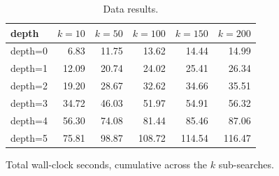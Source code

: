 \begin{table}[H]
\centering
\caption{Data results.}
\small
\setlength{\tabcolsep}{6pt}
\begin{tabular}{lrrrrr}
\toprule
\textbf{depth} & \textbf{$k{=}10$} & \textbf{$k{=}50$} & \textbf{$k{=}100$} & \textbf{$k{=}150$} & \textbf{$k{=}200$} \\
\midrule
  depth=0 & \cellcolor[HTML]{63BE7B}6.83 & \cellcolor[HTML]{63BE7B}11.75 & \cellcolor[HTML]{63BE7B}13.62 & \cellcolor[HTML]{63BE7B}14.44 & \cellcolor[HTML]{63BE7B}14.99 \\
  depth=1 & \cellcolor[HTML]{7BC57C}12.09 & \cellcolor[HTML]{83C77D}20.74 & \cellcolor[HTML]{85C87D}24.02 & \cellcolor[HTML]{85C87D}25.41 & \cellcolor[HTML]{86C87D}26.34 \\
  depth=2 & \cellcolor[HTML]{9BCE7E}19.20 & \cellcolor[HTML]{A0CF7E}28.67 & \cellcolor[HTML]{A1D07F}32.62 & \cellcolor[HTML]{A2D07F}34.66 & \cellcolor[HTML]{A2D07F}35.51 \\
  depth=3 & \cellcolor[HTML]{E1E282}34.72 & \cellcolor[HTML]{DEE182}46.03 & \cellcolor[HTML]{E1E282}51.97 & \cellcolor[HTML]{E1E282}54.91 & \cellcolor[HTML]{E2E382}56.32 \\
  depth=4 & \cellcolor[HTML]{FCB379}56.30 & \cellcolor[HTML]{FCB379}74.08 & \cellcolor[HTML]{FCB479}81.44 & \cellcolor[HTML]{FCB57A}85.46 & \cellcolor[HTML]{FCB479}87.06 \\
  depth=5 & \cellcolor[HTML]{F8696B}75.81 & \cellcolor[HTML]{F8696B}98.87 & \cellcolor[HTML]{F8696B}108.72 & \cellcolor[HTML]{F8696B}114.54 & \cellcolor[HTML]{F8696B}116.47 \\
\bottomrule
\end{tabular}
\end{table}


\begin{insights}
\begin{sentences}
\item Total wall-clock seconds, cumulative across the $k$ sub-searches.
\end{sentences}
\end{insights}

